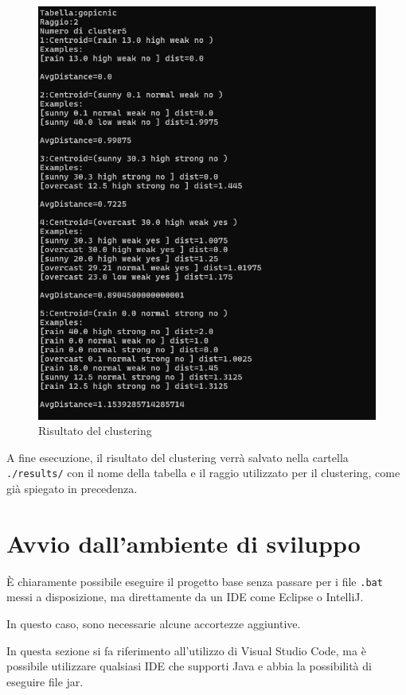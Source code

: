 \begin{figure}[h!]
    \centering
    \includegraphics[width = 0.7 \textwidth]{images/risultato atteso.png}
    \caption{Risultato del clustering}
\end{figure}

A fine esecuzione, il risultato del clustering verrà salvato nella cartella \texttt{./results/} con il nome della tabella e il raggio utilizzato per il clustering, come già spiegato in precedenza.

\section{Avvio dall'ambiente di sviluppo}

È chiaramente possibile eseguire il progetto base senza passare per i file \texttt{.bat} messi a disposizione, ma direttamente da un IDE come Eclipse o IntelliJ.

In questo caso, sono necessarie alcune accortezze aggiuntive. 

\begin{tcolorbox}[  colback=white!5!white, colframe=gray, title={Avvertenza} ]

    In questa sezione si fa riferimento all'utilizzo di Visual Studio Code, ma è possibile utilizzare qualsiasi IDE che supporti Java e abbia la possibilità di eseguire file jar.

\end{tcolorbox}


